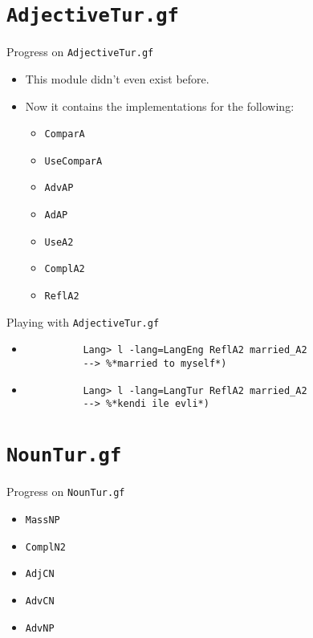 \documentclass{beamer}
\begin{document}
  \section{\texttt{AdjectiveTur.gf}}

  \begin{frame}{Progress on \texttt{AdjectiveTur.gf}}
    \begin{itemize}
      \item<1-> This module didn't even exist before.
      \item<2-> Now it contains the implementations for the following:
        \begin{itemize}
          \item \texttt{ComparA}
          \item \texttt{UseComparA}
          \item \texttt{AdvAP}
          \item \texttt{AdAP}
          \item \texttt{UseA2}
          \item \texttt{ComplA2}
          \item \texttt{ReflA2}
        \end{itemize}
    \end{itemize}
  \end{frame}

  \begin{frame}[fragile]{Playing with \texttt{AdjectiveTur.gf}}
    \begin{itemize}
      \item<1->
        \begin{lstlisting}
          Lang> l -lang=LangEng ReflA2 married_A2
          --> %*married to myself*)
        \end{lstlisting}
      \item<2->
        \begin{lstlisting}
          Lang> l -lang=LangTur ReflA2 married_A2
          --> %*kendi ile evli*)
        \end{lstlisting}
    \end{itemize}
  \end{frame}

  \section{\texttt{NounTur.gf}}

  \begin{frame}{Progress on \texttt{NounTur.gf}}
    \begin{itemize}
      \item \texttt{MassNP}
      \item \texttt{ComplN2}
      \item \texttt{AdjCN}
      \item \texttt{AdvCN}
      \item \texttt{AdvNP}
    \end{itemize}
  \end{frame}
\end{document}
